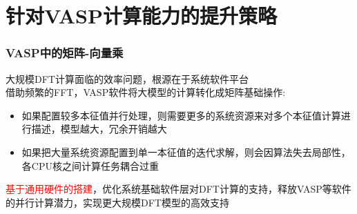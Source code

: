 \section{针对\rm{VASP}计算能力的提升策略}
\begin{frame}
	\frametitle{\textrm{VASP}中的矩阵-向量乘}
	大规模\textrm{DFT}计算面临的效率问题，根源在于系统软件平台\\
	{\fontsize{7.2pt}{5.2pt}}
	\vskip 3pt 
借助频繁的\textrm{FFT}，\textrm{VASP}软件将大模型的计算转化成矩阵基础操作:\\
{\fontsize{7.2pt}{5.2pt}}
	\begin{itemize}
		\item 如果配置较多本征值并行处理，则需要更多的系统资源来对多个本征值计算进行描述，模型越大，冗余开销越大\\
			{\fontsize{7.2pt}{5.2pt}\selectfont{可能影响软件的实用性，甚至超过了现有计算机集群的处理极限}}
		\item 如果把大量系统资源配置到单一本征值的迭代求解，则会因算法失去局部性，各\textrm{CPU}核之间计算任务耦合过重\\
	{\fontsize{7.2pt}{5.2pt}\selectfont{可能造成系统过载}}
	\end{itemize}
	\textcolor{red}{基于通用硬件的搭建}，优化系统基础软件层对\textrm{DFT}计算的支持，释放\textrm{VASP}等软件的并行计算潜力，实现更大规模\textrm{DFT}模型的高效支持
\end{frame}

